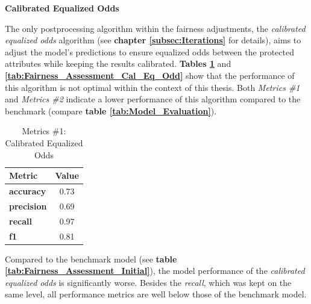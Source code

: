 \textbf{Calibrated Equalized Odds}

The only postprocessing algorithm within the fairness adjustments, the \textit{calibrated equalized odds} algorithm (see \textbf{chapter \ref{subsec:Iterations}} for details), aims to adjust the model's predictions to ensure equalized odds between the protected attributes while keeping the results calibrated.
\textbf{Tables \ref{tab:Model_Evaluation_Cal_Eq_Odd}} and \textbf{\ref{tab:Fairness_Assessment_Cal_Eq_Odd}} show that the performance of this algorithm is not optimal within the context of this thesis. Both \textit{Metrics \#1} and \textit{Metrics \#2} indicate a lower performance of this algorithm compared to the benchmark (compare \textbf{table \ref{tab:Model_Evaluation}}).

\begin{table}[!htbp]
    \centering
    \begin{tabular}{l c}
    \toprule
    \textbf{Metric} & \textbf{Value} \\
    \midrule
    \textbf{accuracy} & 0.73 \\
    \textbf{precision} & 0.69 \\
    \textbf{recall} & 0.97 \\
    \textbf{f1} & 0.81 \\
    \bottomrule
    \end{tabular}
    \caption{Metrics \#1: Calibrated Equalized Odds}
    \small
    Compared to the benchmark model (see \textbf{table \ref{tab:Fairness_Assessment_Initial}}), the model performance of the \textit{calibrated equalized odds} is significantly worse. Besides the \textit{recall}, which was kept on the same level, all performance metrics are well below those of the benchmark model.
    \label{tab:Model_Evaluation_Cal_Eq_Odd}
\end{table}

